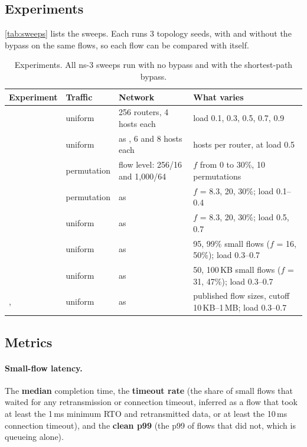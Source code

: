 \subsection{Experiments}

\autoref{tab:sweeps} lists the sweeps. Each runs 3 topology seeds, with and without the bypass on the same flows, so each flow can be compared with itself.

\begin{table}[ht]
\centering
\small
\begin{tabularx}{\linewidth}{@{}l l l L@{}}
\toprule
Experiment & Traffic & Network & What varies \\
\midrule
{} & uniform & 256 routers, 4 hosts each & load 0.1, 0.3, 0.5, 0.7, 0.9 \\
 & uniform & as , 6 and 8 hosts each & hosts per router, at load 0.5 \\
 & permutation & flow level: 256/16 and 1{,}000/64 & $f$ from 0 to 30\%, 10 permutations \\
 & permutation & as  & $f$ = 8.3, 20, 30\%; load 0.1--0.4 \\
 & uniform & as  & $f$ = 8.3, 20, 30\%; load 0.5, 0.7 \\
 & uniform & as  & 95, 99\% small flows ($f$ = 16, 50\%); load 0.3--0.7 \\
 & uniform & as  & 50, 100\,KB small flows ($f$ = 31, 47\%); load 0.3--0.7 \\
,  & uniform & as  & published flow sizes, cutoff 10\,KB--1\,MB; load 0.3--0.7 \\
\bottomrule
\end{tabularx}
\caption{Experiments. All ns-3 sweeps run with no bypass and with the shortest-path bypass.}
\label{tab:sweeps}
\end{table}

\subsection{Metrics}

\paragraph{Small-flow latency.} The \textbf{median} completion time, the \textbf{timeout rate} (the share of small flows that waited for any retransmission or connection timeout, inferred as a flow that took at least the 1\,ms minimum RTO and retransmitted data, or at least the 10\,ms connection timeout), and the \textbf{clean p99} (the p99 of flows that did not, which is queueing alone).

